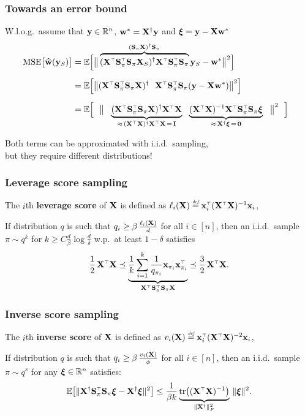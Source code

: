 \documentclass{beamer}
\begin{document}
\begin{frame}
  \frametitle{Towards an error bound}
  W.l.o.g.~assume that $\mathbf y\in\mathbb R^n$, $\mathbf w^*=\mathbf X^\dagger\mathbf y$ and $\boldsymbol\xi=\mathbf y-\mathbf X\mathbf w^*$
  \begin{align*}
\hspace{-3mm}\MSE{\wbh(\y_S)}
    &=
    \E\Big[\big\|\overbrace{(\X^\top\S_\pi^\top\S_\pi\X_S)^{\dagger}\X^\top\S_\pi^\top\S_\pi}^{(\S_\pi\X)^\dagger\S_\pi}\y_S-\w^*\big\|^2\Big]
\\[2mm] &=    \E\Big[\big\|(\X^\top\S_\pi^\top\S_\pi\X)^{\dagger}\ \
     \X^\top\S_\pi^\top\S_\pi(\y-\X\w^*)\big\|^2\Big]
\\[2mm] &=\E\Big[\ \
     \big\|\ \ \underbrace{(\X^\top\S_\pi^\top\S_\pi\X)^{\dagger}\X^\top\X}_{\approx\,(\X^\top\X)^\dagger\X^\top\X\,=\,\I}\ \
     \underbrace{(\X^\top\X)^{-1}\X^\top\S_\pi^\top\S_\pi\xib}_{\approx\,\X^\dagger\xib\,=\,\zero}
     \ \ \big\|^2\ \ \Big]
  \end{align*}
  \pause\vspace{3mm}
  
  Both terms can be approximated with i.i.d.~sampling,\\
  but they require different distributions!
\end{frame}

\begin{frame}
  \frametitle{Leverage score sampling}
\begin{definition}
The $i$th \textbf{leverage score} of $\mathbf X$ is
defined as $\ell_i(\X)\defeq \x_i^\top(\X^\top\X)^{-1}\x_i$,
\end{definition}
\pause
\begin{theorem}[[Tro2012{]}]
If distribution $q$ is such that
$q_i\geq \beta\,\frac{\ell_i(\mathbf X)}{d}$ for all $i\in[n]$, then an i.i.d.~sample
$\pi\sim q^k$ for $k\geq C\frac d\beta\log
\frac d\delta$ w.p.~at least $1-\delta$ satisfies
\begin{align*}
\frac12\,\X^\top\X\preceq
  \underbrace{\frac1k\sum_{i=1}^k\frac1{q_{\pi_i}}\x_{\pi_i}\x_{\pi_i}^\top}_{\X^\top\S_\pi^\top\S_\pi\X}\preceq
  \frac32\,\X^\top\X. 
\end{align*}
\end{theorem}

\end{frame}

\begin{frame}
\frametitle{Inverse score sampling}
\begin{definition}
The $i$th \textbf{inverse score} of $\mathbf X$ is
defined as $v_i(\X)\defeq \x_i^\top(\X^\top\X)^{-2}\x_i$,
\end{definition}
\pause
\begin{lemma}
If distribution $q$ is such that
$q_i\geq \beta\,\frac{v_i(\mathbf X)}{\phi}$ for all $i\in[n]$, then an i.i.d.~sample
$\pi\sim q^s$ for any $\boldsymbol\xi\in\mathbb R^n$ satisfies:
\begin{align*}
\E\big[\|\X^\dagger\S_\pi^\top\S_\pi\xib - \X^\dagger\xib\|^2\big]
  \leq \frac1{\beta k} \underbrace{\tr\big((\X^\top\X)^{-1}\big)}_{\|\X^\dagger\|_F^2}\,\|\xib\|^2.
\end{align*}
\end{lemma}
\end{frame}
\end{document}
